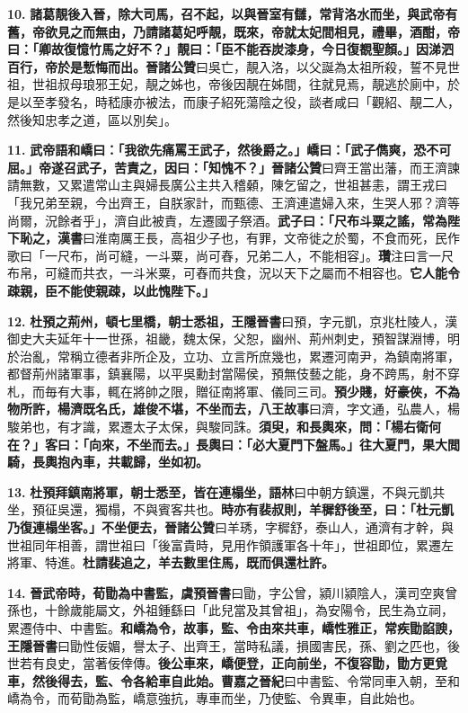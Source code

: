 \textbf{10.} \textbf{諸葛靚後入晉，除大司馬，召不起，以與晉室有讎，常背洛水而坐，與武帝有舊，帝欲見之而無由，乃請諸葛妃呼靚，既來，帝就太妃間相見，禮畢，酒酣，帝曰：「卿故復憶竹馬之好不？」靚曰：「臣不能吞炭漆身，今日復覩聖顏。」因涕泗百行，帝於是慙悔而出。}{\footnotesize \textbf{晉諸公贊}曰吳亡，靚入洛，以父誕為太祖所殺，誓不見世祖，世祖叔母琅邪王妃，靚之姊也，帝後因靚在姊間，往就見焉，靚逃於廁中，於是以至孝發名，時嵇康亦被法，而康子紹死蕩陰之役，談者咸曰「觀紹、靚二人，然後知忠孝之道，區以別矣」。}

\textbf{11.} \textbf{武帝語和嶠曰：「我欲先痛罵王武子，然後爵之。」嶠曰：「武子儁爽，恐不可屈。」帝遂召武子，苦責之，因曰：「知愧不？」}{\footnotesize \textbf{晉諸公贊}曰齊王當出藩，而王濟諫請無數，又累遣常山主與婦長廣公主共入稽顙，陳乞留之，世祖甚恚，謂王戎曰「我兄弟至親，今出齊王，自朕家計，而甄德、王濟連遣婦入來，生哭人邪？濟等尚爾，況餘者乎」，濟自此被責，左遷國子祭酒。}\textbf{武子曰：「尺布斗粟之謠，常為陛下恥之，}{\footnotesize \textbf{漢書}曰淮南厲王長，高祖少子也，有罪，文帝徙之於蜀，不食而死，民作歌曰「一尺布，尚可縫，一斗粟，尚可舂，兄弟二人，不能相容」。\textbf{瓚}注曰言一尺布帛，可縫而共衣，一斗米粟，可舂而共食，況以天下之屬而不相容也。}\textbf{它人能令疎親，臣不能使親疎，以此愧陛下。」}

\textbf{12.} \textbf{杜預之荊州，頓七里橋，朝士悉祖，}{\footnotesize \textbf{王隱晉書}曰預，字元凱，京兆杜陵人，漢御史大夫延年十一世孫，祖畿，魏太保，父恕，幽州、荊州刺史，預智謀淵博，明於治亂，常稱立德者非所企及，立功、立言所庶幾也，累遷河南尹，為鎮南將軍，都督荊州諸軍事，鎮襄陽，以平吳勳封當陽侯，預無伎藝之能，身不跨馬，射不穿札，而毎有大事，輒在將帥之限，贈征南將軍、儀同三司。}\textbf{預少賤，好豪俠，不為物所許，楊濟既名氏，雄俊不堪，不坐而去，}{\footnotesize \textbf{八王故事}曰濟，字文通，弘農人，楊駿弟也，有才識，累遷太子太保，與駿同誅。}\textbf{須臾，和長輿來，問：「楊右衛何在？」客曰：「向來，不坐而去。」長輿曰：「必大夏門下盤馬。」往大夏門，果大閲騎，長輿抱內車，共載歸，坐如初。}

\textbf{13.} \textbf{杜預拜鎮南將軍，朝士悉至，皆在連榻坐，}{\footnotesize \textbf{語林}曰中朝方鎮還，不與元凱共坐，預征吳還，獨榻，不與賓客共也。}\textbf{時亦有裴叔則，羊穉舒後至，曰：「杜元凱乃復連榻坐客。」不坐便去，}{\footnotesize \textbf{晉諸公贊}曰羊琇，字穉舒，泰山人，通濟有才幹，與世祖同年相善，謂世祖曰「後富貴時，見用作領護軍各十年」，世祖即位，累遷左將軍、特進。}\textbf{杜請裴追之，羊去數里住馬，既而俱還杜許。}

\textbf{14.} \textbf{晉武帝時，荀勖為中書監，}{\footnotesize \textbf{虞預晉書}曰勖，字公曾，潁川潁陰人，漢司空爽曾孫也，十餘歲能屬文，外祖鍾繇曰「此兒當及其曾祖」，為安陽令，民生為立祠，累遷侍中、中書監。}\textbf{和嶠為令，故事，監、令由來共車，嶠性雅正，常疾勖諂諛，}{\footnotesize \textbf{王隱晉書}曰勖性佞媚，譽太子、出齊王，當時私議，損國害民，孫、劉之匹也，後世若有良史，當著佞倖傳。}\textbf{後公車來，嶠便登，正向前坐，不復容勖，勖方更覓車，然後得去，監、令各給車自此始。}{\footnotesize \textbf{曹嘉之晉紀}曰中書監、令常同車入朝，至和嶠為令，而荀勖為監，嶠意強抗，專車而坐，乃使監、令異車，自此始也。}

